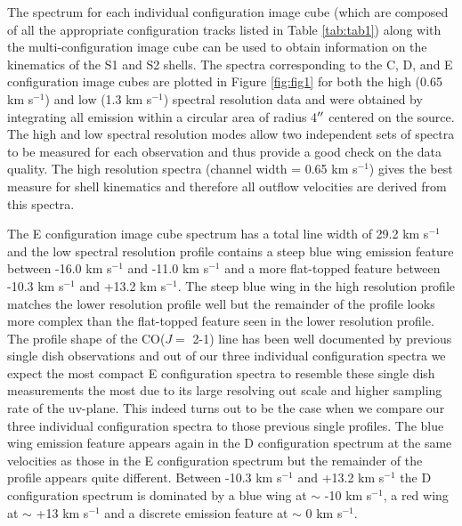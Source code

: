 \documentclass[apj]{emulateapj}
\begin{document}
The spectrum for each individual configuration image cube (which are composed of all the appropriate configuration tracks listed in Table \ref{tab:tab1}) along with the multi-configuration image cube can be used to obtain information on the kinematics of the S1 and S2 shells. The spectra corresponding  to the C, D, and E configuration image cubes are plotted in Figure \ref{fig:fig1} for both the high (0.65 km s${}^{-1}$) and low (1.3 km s${}^{-1}$) spectral resolution data and were obtained by integrating all emission within a circular area of radius 4$\mbox{$^{\prime\prime}$}$ centered on the source. The high and low spectral resolution modes allow two independent sets of spectra to be measured for each observation and thus provide a good check on the data quality. The high resolution  spectra (channel width = 0.65 km s${}^{-1}$)  gives the best measure for shell kinematics and therefore all outflow velocities are derived from this spectra.

The E configuration image cube spectrum has a total line width of 29.2 km s${}^{-1}$ and the low spectral resolution profile contains a steep blue wing emission feature between -16.0 km s${}^{-1}$ and -11.0 km s${}^{-1}$ and a more flat-topped feature between -10.3 km s${}^{-1}$ and +13.2 km s${}^{-1}$. The steep blue wing in the high resolution profile matches the lower resolution profile well but the  remainder of the profile looks more complex than the flat-topped feature seen in the lower resolution profile. The profile shape of the CO($J=$ 2-1) line has been well documented by previous single dish observations \citep[e.g.][]{1980ApJ...242L..25K, 1987ApJ...313..400H} and out of our three individual configuration spectra we expect the most compact E configuration spectra to resemble these single dish measurements the most due to its large resolving out scale and higher sampling rate of the uv-plane. This indeed turns out to be the case when we compare our three individual configuration spectra to those previous single profiles. The blue wing emission feature appears again in the D configuration spectrum at the same velocities as those in the E configuration spectrum but the remainder of the profile appears quite different. Between -10.3 km s${}^{-1}$ and +13.2 km s${}^{-1}$ the D configuration spectrum is dominated by a blue wing at $\sim$ -10 km s${}^{-1}$, a red wing at $\sim$ +13 km s${}^{-1}$ and a discrete emission feature at $\sim$ 0 km s${}^{-1}$. 
\end{document}
